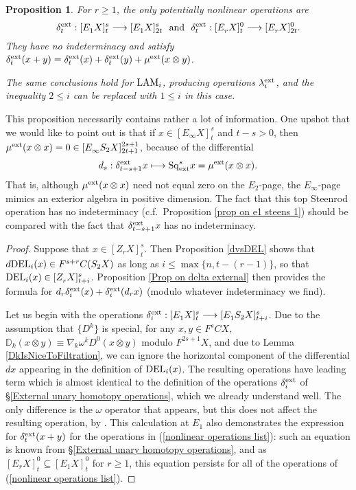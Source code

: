\documentclass[11pt]{amsart} \renewcommand{\baselinestretch}{1.2}
\theoremstyle{plain}
\newtheorem{prop}[thm]{Proposition}
\numberwithin{equation}{section} %
\theoremstyle{plain}
\newtheorem{prop}[thm]{Proposition}
\numberwithin{equation}{chapter} %
\renewcommand{\to}{\longrightarrow}
\newcommand{\twist}{\omega}
\newcommand{\Sq}{\mathrm{Sq}}
\newcommand{\E}[5]{[E^{#1}_{#2}#3]^{#4}_{#5}}
\newcommand{\Edownup}[5]{[E_{#1}^{#2}#3]^{#4}_{#5}}
\newcommand{\EZdownup}[5]{[Z^{#2}_{#1}#3]^{#4}_{#5}}
\renewcommand{\mapsto}{\longmapsto}
\begin{document}
\begin{second quadrant homotopy sseq operations}
\begin{prop}
For $r\geq1$, the only potentially nonlinear operations are
\begin{equation}
\label{nonlinear operations list}
\delta^\textup{ext}_t: \E{}{1}{X}{s}{t}\to  \E{}{1}{X}{s}{2t}\textup{ \ and \ } \delta^\textup{ext}_t: \E{}{r}{X}{0}{t}\to  \E{}{r}{X}{0}{2t}.
\end{equation}
They  have no indeterminacy and satisfy $\delta^\textup{ext}_t(x+y)=\delta^\textup{ext}_t(x)+\delta^\textup{ext}_t(y)+\mu^\textup{ext}(x\otimes y)$.


The same conclusions hold for $\textup{LAM}_i$, producing operations $\lambda_i^\textup{ext}$, and the inequality $2\leq i$ can be replaced with $1\leq i$ in this case.
\end{prop}
\noindent This proposition necessarily contains rather a lot of information. One upshot that we would like to point out is that if $x\in \E{}{\infty}{X}{s}{t}$ and $t-s>0$, then $\mu^\textup{ext}(x\otimes x)=0\in\E{}{\infty}{S_2X}{2s+1}{2t+1}$, because of the differential
\[d_{s}:\delta^\textup{ext}_{t-s+1}x\mapsto \Sq_\textup{ext}^{s}x=\mu^\textup{ext}(x\otimes x).\]
That is, although $\mu^\textup{ext}(x\otimes x)$ need not equal zero on the $E_2$-page, the $E_\infty$-page mimics an exterior algebra in positive dimension.
The fact  that this top Steenrod operation has no indeterminacy (c.f.\ Proposition \ref{prop on e1 steens 1}) should be compared  with the fact that $\delta^\textup{ext}_{t-s+1}x$ has no indeterminacy.

\begin{proof}
Suppose that $x\in \EZdownup{r}{}{X}{s}{t}$. Then Proposition \ref{dvsDEL} shows that $d\textup{DEL}_i(x)\in F^{s+r}C(S_2X)$ as long as $i\leq \max\{n,t-(r-1)\}$, so that $\textup{DEL}_i(x)\in \EZdownup{r}{}{X}{s}{t+i}$. 
Proposition \ref{Prop on delta external} then provides the formula for 
$d_r\delta^\textup{ext}_i(x)+ \delta^\textup{ext}_i(d_rx)$ (modulo whatever indeterminacy we find).

Let us begin with the operations $\delta^\textup{ext}_i:\Edownup{1}{}{X}{s}{t}\to \Edownup{1}{}{S_2X}{s}{t+i}$. Due to the assumption that $\{D^k\}$ is special, for any $x,y\in F^{s}CX$, $\mathbb{D}_k(x\otimes  y)\equiv \nabla_k\twist^k D^0(x\otimes y) $ modulo $F^{2s+1}X$, and due to Lemma \ref{DkIsNiceToFiltration}, we can ignore the horizontal component of the differential $dx$ appearing in the definition of $\textup{DEL}_i(x)$. The resulting operations have leading term which is almost identical to the definition of the operations $\delta_i^\textup{ext}$ of \S\ref{External unary homotopy operations}, which we already understand well. The only difference is the $\twist$ operator that appears, but this does not affect the resulting operation, by \cite[Lemma 4.1]{DwyerHtpyOpsSimpComAlg.pdf}. This calculation at $E_1$ also demonstrates the expression for $\delta_t^\textup{ext}(x+y)$ for the operations in (\ref{nonlinear operations list}): such an equation is known from \S\ref{External unary homotopy operations}, and as $\Edownup{r}{}{X}{0}{t}\subseteq \Edownup{1}{}{X}{0}{t}$ for $r\geq1$, this equation persists for all of the operations of (\ref{nonlinear operations list}).


\end{proof}
\end{second quadrant homotopy sseq operations}
\end{document}
